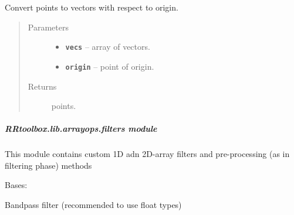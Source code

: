 \documentclass[letterpaper,10pt,english]{sphinxmanual}
\begin{document}

\begin{fulllineitems}
\label{RRtoolbox.lib.arrayops:RRtoolbox.lib.arrayops.convert.vectos2points}
Convert points to vectors with respect to origin.
\begin{quote}\begin{description}
\item[{Parameters}] \leavevmode\begin{itemize}
\item {} 
\textbf{\texttt{vecs}} -- array of vectors.

\item {} 
\textbf{\texttt{origin}} -- point of origin.

\end{itemize}

\item[{Returns}] \leavevmode
points.

\end{description}\end{quote}

\end{fulllineitems}



\subparagraph{RRtoolbox.lib.arrayops.filters module}
\label{RRtoolbox.lib.arrayops:rrtoolbox-lib-arrayops-filters-module}\label{RRtoolbox.lib.arrayops:module-RRtoolbox.lib.arrayops.filters}
This module contains custom 1D adn 2D-array filters and pre-processing (as in filtering phase) methods

\begin{fulllineitems}
\label{RRtoolbox.lib.arrayops:RRtoolbox.lib.arrayops.filters.Bandpass}
Bases: {\hyperref[RRtoolbox.lib.arrayops:RRtoolbox.lib.arrayops.filters.FilterBase]{\emph{}}}

Bandpass filter (recommended to use float types)

\end{fulllineitems}

\end{document}
